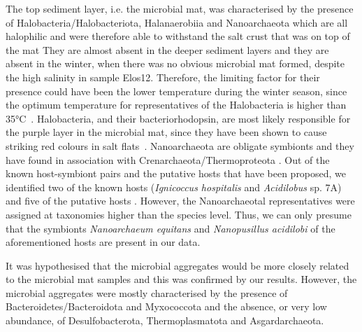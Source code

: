    The top sediment layer, i.e. the microbial mat, was characterised by the presence of Halobacteria/Halobacteriota, 
   Halanaerobiia and Nanoarchaeota which are all halophilic and were therefore able 
   to withstand the salt crust that was on top of the mat 
   \citep{norton_archaeal_1993, casanueva_nanoarchaeal_2008, cinar_prokaryotic_2020, akpolat_prokaryotic_2021}
   They are almost absent in the deeper sediment layers and they are absent in the winter, 
   when there was no obvious microbial mat formed, despite the high salinity in sample Elos12. 
   Therefore, the limiting factor for their presence could have been the lower temperature during the winter season, 
   since the optimum temperature for representatives of the Halobacteria is higher than 35°C~\citep{grant_halobacterium_2015}. 
   Halobacteria, and their bacteriorhodopsin, are most likely responsible for the purple layer in the microbial mat, 
   since they have been shown to cause striking red colours in salt flats~\citep{stoeckenius_bacteriorhodopsin_1979}. 
   Nanoarchaeota are obligate symbionts and they have found in association with Crenarchaeota/Thermoproteota 
   \citep{huber_new_2002, podar_insights_2013, munson-mcgee_nanoarchaeota_2015, wurch_genomics-informed_2016, merkel_microbial_2017}.
   Out of the known host-symbiont pairs and the putative hosts that have been proposed, we identified two of the known hosts 
   (\textit{Ignicoccus hospitalis} and \textit{Acidilobus} sp. 7A) 
   and five of the putative hosts \citep{jarett_single-cell_2018}. 
   However, the Nanoarchaeotal representatives were assigned at taxonomies higher than the species level. 
   Thus, we can only presume that the symbionts \textit{Nanoarchaeum equitans} and \textit{Nanopusillus acidilobi} 
   of the aforementioned hosts are present in our data. 

   It was hypothesised that the microbial aggregates would be more closely related to the microbial mat samples 
   and this was confirmed by our results. 
   However, the microbial aggregates were mostly characterised by the presence of Bacteroidetes/Bacteroidota and Myxococcota 
   and the absence, or very low abundance, of Desulfobacterota, Thermoplasmatota and Asgardarchaeota.

